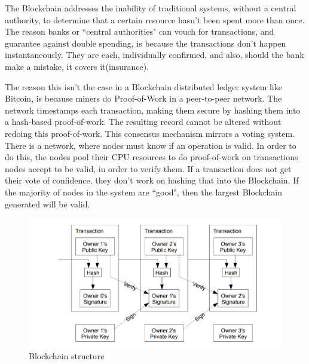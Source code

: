 The Blockchain addresses the inability of traditional systems, without a central authority, to determine that a certain resource hasn't been spent more than once. The reason banks or ``central authorities" can vouch for transactions, and guarantee against double spending, is because the transactions don't happen instantaneously. They are each, individually confirmed, and also, should the bank make a mistake, it covers it(insurance).\par 
The reason this isn't the case in a Blockchain distributed ledger system like Bitcoin, is because miners do Proof-of-Work in a peer-to-peer network. The network timestamps each transaction, making them secure by hashing them into a hash-based proof-of-work. The resulting record cannot be altered without redoing this proof-of-work. This consensus mechanism\cite{014} mirrors a voting system. There is a network, where nodes must know if an operation is valid. In order to do this, the nodes pool their CPU resources to do proof-of-work on transactions nodes accept to be valid, in order to verify them. If a transaction does not get their vote of confidence, they don't work on hashing that into the Blockchain. If the majority of nodes in the system are ``good", then the largest Blockchain generated will be valid.
\begin{figure}[ht] 
\includegraphics[width=6in]{hashes.png}
\caption{Blockchain structure\cite{015}}
\end{figure}

